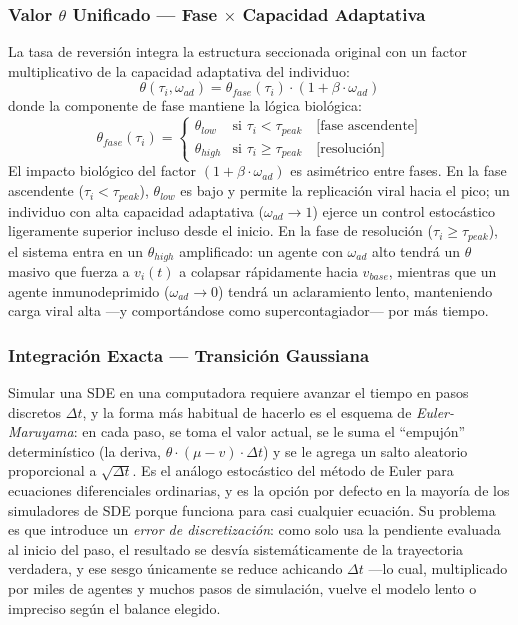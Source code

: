 \documentclass[conference]{IEEEtran}
\begin{document}
\subsubsection{Valor $\theta$ Unificado --- Fase $\times$ Capacidad Adaptativa}
La tasa de reversión integra la estructura seccionada original con un factor multiplicativo de la capacidad adaptativa del individuo:
\begin{equation}
\theta(\tau_i, \omega_{ad}) = \theta_{fase}(\tau_i) \cdot (1 + \beta \cdot \omega_{ad})
\end{equation}
donde la componente de fase mantiene la lógica biológica:
\begin{equation}
\theta_{fase}(\tau_i) = \begin{cases} \theta_{low} & \text{si } \tau_i < \tau_{peak} \quad \text{[fase ascendente]} \\ \theta_{high} & \text{si } \tau_i \geq \tau_{peak} \quad \text{[resolución]} \end{cases}
\end{equation}
El impacto biológico del factor $(1+\beta\cdot\omega_{ad})$ es asimétrico entre fases. En la fase ascendente ($\tau_i < \tau_{peak}$), $\theta_{low}$ es bajo y permite la replicación viral hacia el pico; un individuo con alta capacidad adaptativa ($\omega_{ad}\to 1$) ejerce un control estocástico ligeramente superior incluso desde el inicio. En la fase de resolución ($\tau_i \geq \tau_{peak}$), el sistema entra en un $\theta_{high}$ amplificado: un agente con $\omega_{ad}$ alto tendrá un $\theta$ masivo que fuerza a $v_i(t)$ a colapsar rápidamente hacia $v_{base}$, mientras que un agente inmunodeprimido ($\omega_{ad}\to 0$) tendrá un aclaramiento lento, manteniendo carga viral alta ---y comportándose como supercontagiador--- por más tiempo.

\subsubsection{Integración Exacta --- Transición Gaussiana}
Simular una SDE en una computadora requiere avanzar el tiempo en pasos discretos $\Delta t$, y la forma más habitual de hacerlo es el esquema de \emph{Euler-Maruyama}: en cada paso, se toma el valor actual, se le suma el ``empujón'' determinístico (la deriva, $\theta\cdot(\mu-v)\cdot\Delta t$) y se le agrega un salto aleatorio proporcional a $\sqrt{\Delta t}$. Es el análogo estocástico del método de Euler para ecuaciones diferenciales ordinarias, y es la opción por defecto en la mayoría de los simuladores de SDE porque funciona para casi cualquier ecuación. Su problema es que introduce un \emph{error de discretización}: como solo usa la pendiente evaluada al inicio del paso, el resultado se desvía sistemáticamente de la trayectoria verdadera, y ese sesgo únicamente se reduce achicando $\Delta t$ ---lo cual, multiplicado por miles de agentes y muchos pasos de simulación, vuelve el modelo lento o impreciso según el balance elegido.
\end{document}
